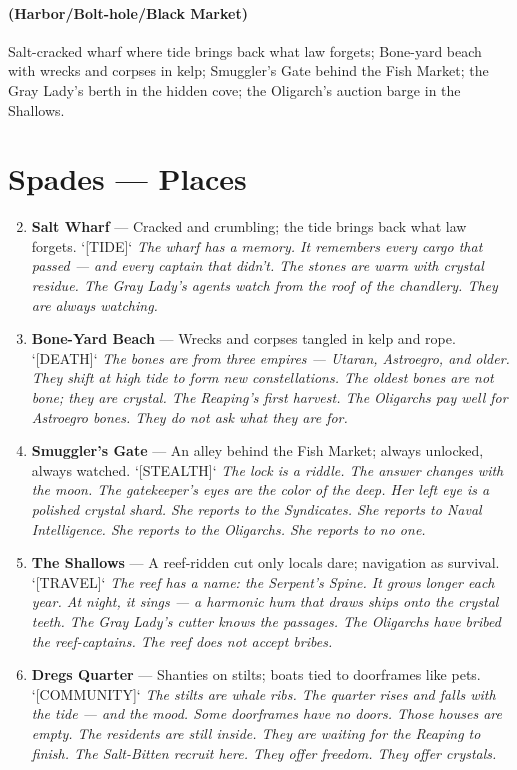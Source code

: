 \paragraph*{(Harbor/Bolt-hole/Black Market)} Salt-cracked wharf where tide brings back what law forgets; Bone-yard beach with wrecks and corpses in kelp; Smuggler's Gate behind the Fish Market; the Gray Lady's berth in the hidden cove; the Oligarch's auction barge in the Shallows.

\section*{Spades --- Places}
\label{sec:zakov-places}
\begin{enumerate}
\setcounter{enumi}{1}
\item \textbf{Salt Wharf} --- Cracked and crumbling; the tide brings back what law forgets. `[TIDE]`
  \hfill \textit{The wharf has a memory. It remembers every cargo that passed --- and every captain that didn't. The stones are warm with crystal residue. The Gray Lady's agents watch from the roof of the chandlery. They are always watching.}
\item \textbf{Bone-Yard Beach} --- Wrecks and corpses tangled in kelp and rope. `[DEATH]`
  \hfill \textit{The bones are from three empires --- Utaran, Astroegro, and older. They shift at high tide to form new constellations. The oldest bones are not bone; they are crystal. The Reaping's first harvest. The Oligarchs pay well for Astroegro bones. They do not ask what they are for.}
\item \textbf{Smuggler's Gate} --- An alley behind the Fish Market; always unlocked, always watched. `[STEALTH]`
  \hfill \textit{The lock is a riddle. The answer changes with the moon. The gatekeeper's eyes are the color of the deep. Her left eye is a polished crystal shard. She reports to the Syndicates. She reports to Naval Intelligence. She reports to the Oligarchs. She reports to no one.}
\item \textbf{The Shallows} --- A reef-ridden cut only locals dare; navigation as survival. `[TRAVEL]`
  \hfill \textit{The reef has a name: the Serpent's Spine. It grows longer each year. At night, it sings --- a harmonic hum that draws ships onto the crystal teeth. The Gray Lady's cutter knows the passages. The Oligarchs have bribed the reef-captains. The reef does not accept bribes.}
\item \textbf{Dregs Quarter} --- Shanties on stilts; boats tied to doorframes like pets. `[COMMUNITY]`
  \hfill \textit{The stilts are whale ribs. The quarter rises and falls with the tide --- and the mood. Some doorframes have no doors. Those houses are empty. The residents are still inside. They are waiting for the Reaping to finish. The Salt-Bitten recruit here. They offer freedom. They offer crystals.}

\end{enumerate}
